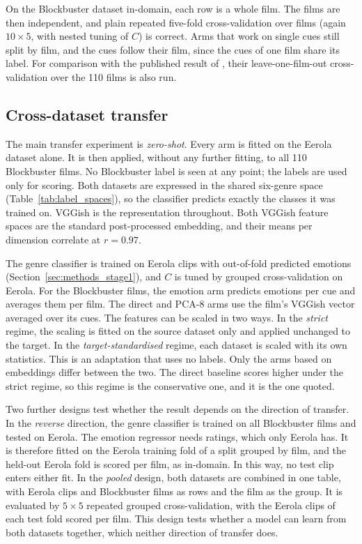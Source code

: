 On the Blockbuster dataset in-domain, each row is a whole film. The films are then independent, and plain repeated five-fold cross-validation over films (again $10\times5$, with nested tuning of $C$) is correct. Arms that work on single cues still split by film, and the cues follow their film, since the cues of one film share its label. For comparison with the published result of \citet{ma2021computational}, their leave-one-film-out cross-validation over the 110 films is also run.

\subsection{Cross-dataset transfer}
\label{subsec:protocol_transfer}

The main transfer experiment is \emph{zero-shot}. Every arm is fitted on the Eerola dataset alone. It is then applied, without any further fitting, to all 110 Blockbuster films. No Blockbuster label is seen at any point; the labels are used only for scoring. Both datasets are expressed in the shared six-genre space (Table~\ref{tab:label_spaces}), so the classifier predicts exactly the classes it was trained on. VGGish is the representation throughout. Both VGGish feature spaces are the standard post-processed embedding, and their means per dimension correlate at $r=0.97$.

The genre classifier is trained on Eerola clips with out-of-fold predicted emotions (Section~\ref{sec:methods_stage1}), and $C$ is tuned by grouped cross-validation on Eerola. For the Blockbuster films, the emotion arm predicts emotions per cue and averages them per film. The direct and PCA-8 arms use the film's VGGish vector averaged over its cues. The features can be scaled in two ways. In the \emph{strict} regime, the scaling is fitted on the source dataset only and applied unchanged to the target. In the \emph{target-standardised} regime, each dataset is scaled with its own statistics. This is an adaptation that uses no labels. Only the arms based on embeddings differ between the two. The direct baseline scores higher under the strict regime, so this regime is the conservative one, and it is the one quoted.

Two further designs test whether the result depends on the direction of transfer. In the \emph{reverse} direction, the genre classifier is trained on all Blockbuster films and tested on Eerola. The emotion regressor needs ratings, which only Eerola has. It is therefore fitted on the Eerola training fold of a split grouped by film, and the held-out Eerola fold is scored per film, as in-domain. In this way, no test clip enters either fit. In the \emph{pooled} design, both datasets are combined in one table, with Eerola clips and Blockbuster films as rows and the film as the group. It is evaluated by $5\times5$ repeated grouped cross-validation, with the Eerola clips of each test fold scored per film. This design tests whether a model can learn from both datasets together, which neither direction of transfer does.

